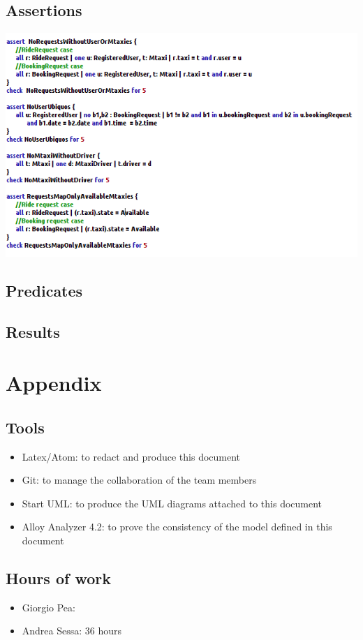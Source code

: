 \documentclass[11pt,titlepage]{article} %
\begin{document}
	\subsection{Assertions}
		\includegraphics[scale=0.8]{assertions.png}
	\subsection{Predicates}

	\subsection{Results}

	\section{Appendix}
	\subsection{Tools}
		\begin{itemize}
			\item Latex/Atom: to redact and produce this document
			\item Git: to manage the collaboration of the team members
			\item Start UML: to produce the UML diagrams attached to this document
			\item Alloy Analyzer 4.2: to prove the consistency of the model defined in this document
		\end{itemize}
	\subsection{Hours of work}
		\begin{itemize}
			\item Giorgio Pea: 
			\item Andrea Sessa: 36 hours
		\end{itemize}
		
\end{document}
